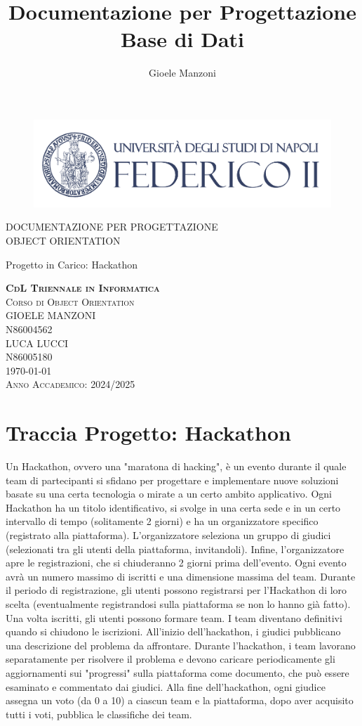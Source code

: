 \documentclass[a4paper, 15pt, oneside]{article}
\author{Gioele Manzoni}
\title{Documentazione per Progettazione Base di Dati}
\begin{document}
	\begin{center}
		\begin{figure}[hb]
			\includegraphics[width=1\textwidth]{../Immagini/coverpic}
		\end{figure}
		{\LARGE DOCUMENTAZIONE PER PROGETTAZIONE \\ OBJECT ORIENTATION \par}
		{\Large{Progetto in Carico: Hackathon \par}}
		\vfill
		{\large{ \textbf{\textsc{CdL Triennale in Informatica}}}}\\
		{\large{\textsc{Corso di Object Orientation}}}\\
		{\large{\textsc{GIOELE MANZONI}}}\\
		{\large{\textsc{N86004562}}}\\
		{\large{\textsc{LUCA LUCCI}}}\\
		{\large{\textsc{N86005180}}}\\
		{\large{\textsc{\today}}}\\
		\Large{\textsc{Anno Accademico: 2024/2025}}
	\end{center}
	\newpage
	\tableofcontents
	\newpage
	\section{Traccia Progetto: Hackathon}
	Un Hackathon, ovvero una "maratona di hacking", è un evento durante il quale team di partecipanti si sfidano per progettare e implementare nuove soluzioni basate su una certa tecnologia o mirate a un certo ambito applicativo. 
	Ogni Hackathon ha un titolo identificativo, si svolge in una certa sede e in un certo intervallo di tempo (solitamente 2 giorni) e ha un organizzatore specifico (registrato alla piattaforma). L'organizzatore seleziona un gruppo di giudici (selezionati tra gli utenti della piattaforma, invitandoli). Infine, l'organizzatore apre le registrazioni, che si chiuderanno 2 giorni prima dell'evento. Ogni evento avrà un numero massimo di iscritti e una dimensione massima del team.
	Durante il periodo di registrazione, gli utenti possono registrarsi per l'Hackathon di loro scelta (eventualmente registrandosi sulla piattaforma se non lo hanno già fatto). Una volta iscritti, gli utenti possono formare team. I team diventano definitivi quando si chiudono le iscrizioni. All'inizio dell'hackathon, i giudici pubblicano una descrizione del problema da affrontare. 
	Durante l'hackathon, i team lavorano separatamente per risolvere il problema e devono caricare periodicamente gli aggiornamenti sui "progressi" sulla piattaforma come documento, che può essere esaminato e commentato dai giudici. Alla fine dell'hackathon, ogni giudice assegna un voto (da 0 a 10) a ciascun team e la piattaforma, dopo aver acquisito tutti i voti, pubblica le classifiche dei team.
\end{document}
